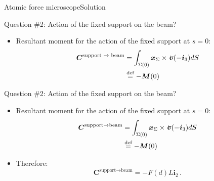 \documentclass{beamer}
\newcommand{\id}{d}
\newcommand{\xj}{x}
\newcommand{\xv}{{\boldsymbol\xj}}
\renewcommand{\ij}{i}
\newcommand{\iv}{{\boldsymbol\ij}}
\newcommand{\Cj}{C}
\newcommand{\Cv}{{\boldsymbol\Cj}}
\newcommand{\stress}{\mbox{$\hspace{0.3em}\rotatebox[x=0pt,y=0.2pt]{90}{\rule{0.017\linewidth}{0.4pt}}\hspace{-0.25em}\upsigma$}}
\newcommand{\Mresj}{M}
\newcommand{\Mres}{{\boldsymbol\Mresj}}
\begin{document}
\begin{frame}{Atomic force microscope}{Solution}
\begin{overprint}
\vskip-20pt
\begin{exampleblock}{Question \#2: Action of the fixed support on the beam?}
\begin{itemize}
\item Resultant moment for the action of the fixed support at $s=0$:
\begin{displaymath}
\begin{split}
\Cv^\text{support $\to$ beam} &=\int_{\Sigma(0)}\xv_\Sigma\times\stress(-\iv_3) \id S \\
&\overset{\text{def}}{=}-\Mres(0)
\end{split}
\end{displaymath}
\end{itemize}
\end{exampleblock}

\vskip-20pt
\begin{exampleblock}{Question \#2: Action of the fixed support on the beam?}
\begin{itemize}
\item Resultant moment for the action of the fixed support at $s=0$:
\begin{displaymath}
\begin{split}
\Cv^\text{support$\to$beam} &=\int_{\Sigma(0)}\xv_\Sigma\times\stress(-\iv_3) \id S \\
&\overset{\text{def}}{=}-\Mres(0)
\end{split}
\end{displaymath}
\item Therefore:
\begin{displaymath}
\Cv^\text{support$\to$beam} =-F(d)L\iv_2\,.
\end{displaymath}
\end{itemize}
\end{exampleblock}

\end{overprint}

\end{frame}
\end{document}
